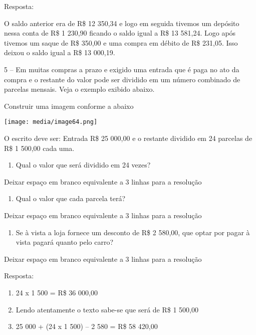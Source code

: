 Resposta:

O saldo anterior era de R\$ 12 350,34 e logo em seguida tivemos um
depósito nessa conta de R\$ 1 230,90 ficando o saldo igual a R\$ 13
581,24. Logo após tivemos um saque de R\$ 350,00 e uma compra em débito
de R\$ 231,05. Isso deixou o saldo igual a R\$ 13 000,19.

5 -- Em muitas compras a prazo e exigido uma entrada que é paga no ato
da compra e o restante do valor pode ser dividido em um número combinado
de parcelas mensais. Veja o exemplo exibido abaixo.

Construir uma imagem conforme a abaixo

\texttt{[image: media/image64.png]}

O escrito deve ser: Entrada R\$ 25 000,00 e o restante dividido em 24
parcelas de R\$ 1 500,00 cada uma.

\begin{enumerate}
\def\labelenumi{\alph{enumi})}
\item
  Qual o valor que será dividido em 24 vezes?
\end{enumerate}

Deixar espaço em branco equivalente a 3 linhas para a resolução

\begin{enumerate}
\def\labelenumi{\alph{enumi})}
\item
  Qual o valor que cada parcela terá?
\end{enumerate}

Deixar espaço em branco equivalente a 3 linhas para a resolução

\begin{enumerate}
\def\labelenumi{\alph{enumi})}
\item
  Se à vista a loja fornece um desconto de R\$ 2 580,00, que optar por
  pagar à vista pagará quanto pelo carro?
\end{enumerate}

Deixar espaço em branco equivalente a 3 linhas para a resolução

Resposta:

\begin{enumerate}
\def\labelenumi{\alph{enumi})}
\item
  24 x 1 500 = R\$ 36 000,00
\item
  Lendo atentamente o texto sabe-se que será de R\$ 1 500,00
\item
  25 000 + (24 x 1 500) -- 2 580 = R\$ 58 420,00
\end{enumerate}

